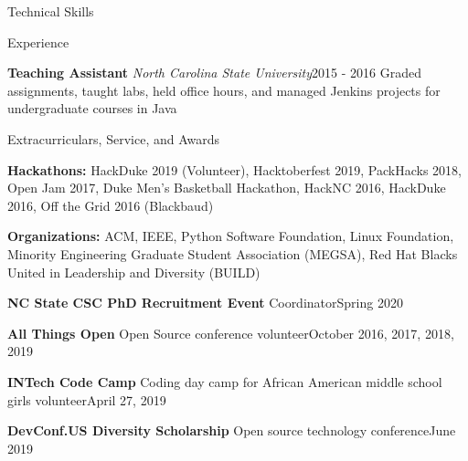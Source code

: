 \documentclass{resume} %
\begin{document}
\begin{rSection}{Technical Skills}
\begin{rSection}{Experience}
\begin{eSubsection}{\small \textbf{Teaching Assistant} \textit{North Carolina State University}}{\small 2015 - 2016}
{\small Graded assignments, taught labs, held office hours, and managed Jenkins projects for undergraduate courses in Java}
\end{eSubsection}
\vspace{-10pt}
\end{rSection}
\begin{rSection}{Extracurriculars, Service, and Awards}
\vspace{-5pt}
\begin{spacing}{0.25}
{\small \textbf{Hackathons:} HackDuke 2019 (Volunteer), Hacktoberfest 2019, PackHacks 2018, Open Jam 2017, Duke Men's Basketball Hackathon, HackNC 2016, HackDuke 2016, Off the Grid 2016 (Blackbaud)}
\end{spacing}
\vspace{5pt}
\begin{spacing}{0.25}
{\small \textbf{Organizations:} ACM, IEEE, Python Software Foundation, Linux Foundation, Minority Engineering Graduate Student Association (MEGSA), Red Hat Blacks United in Leadership and Diversity (BUILD)}
\end{spacing}
\vspace{5pt}
\begin{sSubsection}
{\small \textbf{NC State CSC PhD Recruitment Event} Coordinator}{Spring 2020} 
\end{sSubsection}
\vspace{-8pt}
\begin{sSubsection}
{\small \textbf{All Things Open} Open Source conference volunteer}{October 2016, 2017, 2018, 2019} 
\end{sSubsection}
\vspace{-8pt}
\begin{sSubsection}
{\small \textbf{INTech Code Camp} Coding day camp for African American middle school girls volunteer}{April 27, 2019} 
\end{sSubsection}
\vspace{-8pt}
\begin{sSubsection}
{\small \textbf{DevConf.US Diversity Scholarship} Open source technology conference}{June 2019} 
\end{sSubsection}
\vspace{-8pt}
\vspace{-8pt}





\end{rSection}
\end{rSection}
\end{document}
